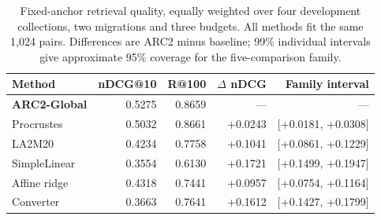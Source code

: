 \begin{table}[t]
\centering
\small
\setlength{\tabcolsep}{4pt}
\caption{Fixed-anchor retrieval quality, equally weighted over four development collections, two migrations and three budgets. All methods fit the same 1,024 pairs. Differences are ARC2 minus baseline; 99\% individual intervals give approximate 95\% coverage for the five-comparison family.}\label{tab:dev}
\begin{tabular}{lrrrr}
\toprule
Method & nDCG@10 & R@100 & $\Delta$ nDCG & Family interval \\
\midrule
\textbf{ARC2-Global} & 0.5275 & 0.8659 & --- & --- \\
Procrustes & 0.5032 & 0.8661 & +0.0243 & [+0.0181, +0.0308] \\
LA2M20 & 0.4234 & 0.7758 & +0.1041 & [+0.0861, +0.1229] \\
SimpleLinear & 0.3554 & 0.6130 & +0.1721 & [+0.1499, +0.1947] \\
Affine ridge & 0.4318 & 0.7441 & +0.0957 & [+0.0754, +0.1164] \\
Converter & 0.3663 & 0.7641 & +0.1612 & [+0.1427, +0.1799] \\
\bottomrule
\end{tabular}
\end{table}
